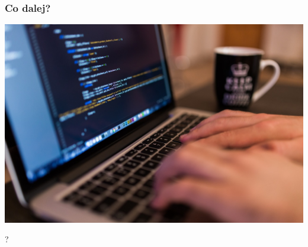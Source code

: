\documentclass[24pt,handout]{beamer}
\begin{document}
\begin{frame}
    \frametitle{Co dalej?}
    \includegraphics[width=\textwidth]{images/coding.jpg}
\end{frame}

\begin{frame}
    \begin{center}
        \Huge ?
    \end{center}
\end{frame}

\endpage
\end{document}

